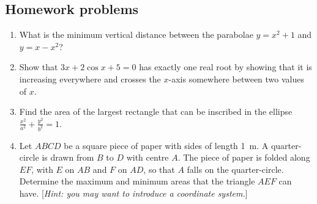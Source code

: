 \subsection{Homework problems}
\begin{enumerate}
  \item What is the minimum vertical distance between the parabolae $ y = x^2 + 1 $ and $ y = x - x^2 $?
  \item Show that $ 3x + 2\cos x + 5 = 0 $ has exactly one real root by showing that it
        is increasing everywhere and crosses the $ x$-axis somewhere between two values of $ x $.
  \item Find the area of the largest rectangle that can be inscribed in the ellipse $ \frac{x^2}{a^2} + \frac{y^2}{b^2} = 1 $.
  \item Let $ ABCD $ be a square piece of paper with sides of length \SI{1}{\metre}. A
        quarter-circle is drawn from $ B $ to $ D $ with centre $ A $. The piece of paper is folded along $ EF $, with $ E $ on $ AB $
        and $ F $ on $ AD $, so that $ A $ falls on the quarter-circle. Determine the maximum and minimum areas that the triangle $ AEF $
        can have. [\textit{Hint: you may want to introduce a coordinate system.}]
\end{enumerate}
